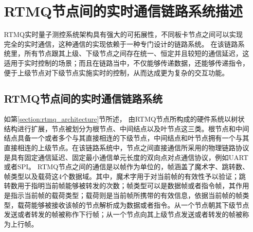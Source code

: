\newpage
\section[RTMQ节点间的实时通信链路系统描述]{RTMQ节点间的实时通信链路系统描述\label{section:rtmq_links}}

RTMQ实时量子测控系统架构具有强大的可拓展性，不同板卡节点之间可以实现完全的实时通信，这种通信的实现依赖于一种专门设计的链路系统。
在该链路系统里，所有节点跟其上级、下级节点之间存在统一、恒定并且较短的通信延迟，这适用于实时控制的场景；而且在链路当中，不仅能够传递数据，还能够传递指令，便于上级节点对下级节点实施实时的控制，从而达成更为复杂的交互功能。

\subsection[RTMQ节点间的实时通信链路系统]{RTMQ节点间的实时通信链路系统}
如第\ref{section:rtmq_architecture}节所述，
由RTMQ节点所构成的硬件系统以树状结构进行扩展，节点被划分为根节点、中间结点以及叶节点这三类。根节点和中间结点具备一个或者多个与其直接相连的下级节点，中间结点和叶节点拥有一个与其直接相连的上级节点。在该链路系统中，节点之间直接通信所采用的物理链路协议是具有固定通信延迟、固定最小通信单元长度的双向点对点通信协议，例如UART或者SPI。
RTMQ节点之间的通信是以帧作为单位的，帧涵盖了魔术字、跳转数、帧类型以及载荷这4个数据域。其中，魔术字用于对当前帧的有效性予以验证；跳转数用于指明当前帧能够被转发的次数；帧类型可以是数据帧或者指令帧，其作用是指示当前帧的载荷类型；载荷则是当前帧所携带的有效信息，依据当前帧的帧类型，载荷能够被接收该帧的节点解析成为数据或者指令。从一个节点朝其下级节点发送或者转发的帧被称作下行帧；从一个节点向其上级节点发送或者转发的帧被称为上行帧。


